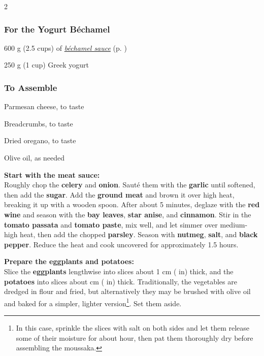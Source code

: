 \begin{multicols}{2}
	\subsubsection*{For the Yogurt Béchamel}
	\begin{ingredients}
		\item 600 g (2.5 cups) of \hyperref[sauce_bechamel]{\textit{béchamel sauce}} (p. \pageref{sauce_bechamel})
		\item 250 g (1 cup) Greek yogurt
	\end{ingredients}
	
	\subsubsection*{To Assemble}
	\begin{ingredients}
		\item Parmesan cheese, to taste
		\item Breadcrumbs, to taste
		\item Dried oregano, to taste
		\item Olive oil, as needed
	\end{ingredients}
\end{multicols}

\vspace*{-0.3 cm}
\textbf{Start with the meat sauce:} \\
Roughly chop the \textbf{celery} and \textbf{onion}.
Sauté them with the \textbf{garlic} until softened, then add the \textbf{sugar}.
Add the \textbf{ground meat} and brown it over high heat, breaking it up with a wooden spoon.
After about 5 minutes, deglaze with the \textbf{red wine} and season with the \textbf{bay leaves}, \textbf{star anise}, and \textbf{cinnamon}.
Stir in the \textbf{tomato passata} and \textbf{tomato paste}, mix well, and let simmer over medium-high heat, then add the chopped \textbf{parsley}.
Season with \textbf{nutmeg}, \textbf{salt}, and \textbf{black pepper}.
Reduce the heat and cook uncovered for approximately 1.5 hours.

\textbf{Prepare the eggplants and potatoes:} \\
Slice the \textbf{eggplants} lengthwise into slices about 1 cm ( in) thick, and the \textbf{potatoes} into slices about  cm ( in) thick.
Traditionally, the vegetables are dredged in flour and fried, but alternatively they may be brushed with olive oil and baked for a simpler, lighter version\footnote{In this case, sprinkle the slices with salt on both sides and let them release some of their moisture for about  hour, then pat them thoroughly dry before assembling the moussaka.}.
Set them aside.

